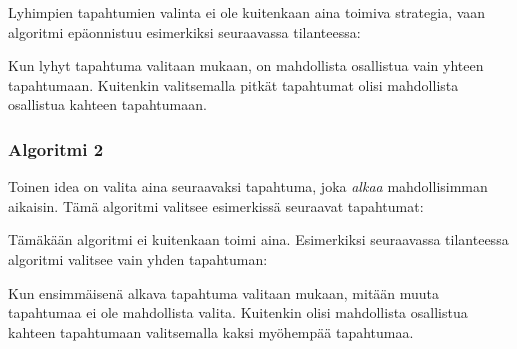 Lyhimpien tapahtumien valinta ei ole kuitenkaan
aina toimiva strategia,
vaan algoritmi epäonnistuu esimerkiksi seuraavassa tilanteessa:
\begin{center}
\end{center}
Kun lyhyt tapahtuma valitaan mukaan,
on mahdollista osallistua vain yhteen tapahtumaan.
Kuitenkin valitsemalla pitkät tapahtumat
olisi mahdollista osallistua kahteen tapahtumaan.

\subsubsection*{Algoritmi 2}

Toinen idea on valita aina seuraavaksi tapahtuma,
joka \emph{alkaa} mahdollisimman aikaisin.
Tämä algoritmi valitsee esimerkissä seuraavat tapahtumat:
\begin{center}
\end{center}

Tämäkään algoritmi ei kuitenkaan toimi aina.
Esimerkiksi seuraavassa tilanteessa
algoritmi valitsee vain yhden tapahtuman:
\begin{center}
\end{center}
Kun ensimmäisenä alkava tapahtuma
valitaan mukaan, mitään muuta tapahtumaa
ei ole mahdollista valita.
Kuitenkin olisi mahdollista osallistua
kahteen tapahtumaan valitsemalla
kaksi myöhempää tapahtumaa.

